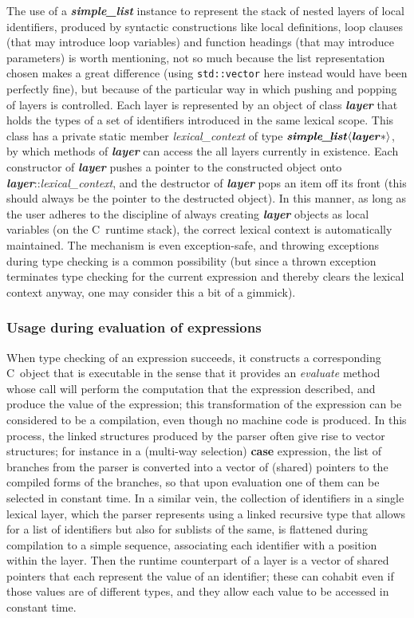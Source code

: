 \documentclass[12pt]{article}
\theoremstyle{plain}
\theoremstyle{definition}
\def\PP{\copy\PPbox}
\newcommand\Cee{\textsc{C}}
\newcommand\Cpp{\Cee\PP}
\newcommand\std[1]{\texttt{std::#1}}
\def\vect.{\std{vector}}
\def\smpl.{\textbf{\textit{simple\_\!list}}}
\def\lay.{\textbf{\textit{layer}}}
\def\ang#1{\langle#1\rangle}
\begin{document}
The use of a \smpl. instance to represent the stack of nested layers of local
identifiers, produced by syntactic constructions like local definitions, loop
clauses (that may introduce loop variables) and function headings (that may
introduce parameters) is worth mentioning, not so much because the list
representation chosen makes a great difference (using \vect. here instead would
have been perfectly fine), but because of the particular way in which pushing
and popping of layers is controlled. Each layer is represented by an object of
class \lay. that holds the types of a set of identifiers introduced in the same
lexical scope. This class has a private static member
\textit{lexical\_\!context} of type $\smpl.\ang{\lay.*}$, by which methods of
\lay. can access the all layers currently in existence. Each constructor of
\lay. pushes a pointer to the constructed object onto
\lay.::\textit{lexical\_\!context}, and the destructor of \lay. pops an item off
its front (this should always be the pointer to the destructed object). In this
manner, as long as the user adheres to the discipline of always creating \lay.
objects as local variables (on the \Cpp\ runtime stack), the correct lexical
context is automatically maintained. The mechanism is even exception-safe, and
throwing exceptions during type checking is a common possibility (but since a
thrown exception terminates type checking for the current expression and thereby
clears the lexical context anyway, one may consider this a bit of a gimmick).

\subsubsection{Usage during evaluation of expressions}

When type checking of an expression succeeds, it constructs a corresponding
\Cpp\ object that is executable in the sense that it provides an
\textit{evaluate} method whose call will perform the computation that the
expression described, and produce the value of the expression; this
transformation of the expression can be considered to be a compilation, even
though no machine code is produced. In this process, the linked structures
produced by the parser often give rise to vector structures; for instance in a
(multi-way selection) \textbf{case} expression, the list of branches from the
parser is converted into a vector of (shared) pointers to the compiled forms of
the branches, so that upon evaluation one of them can be selected in constant
time. In a similar vein, the collection of identifiers in a single lexical
layer, which the parser represents using a linked recursive type that allows for
a list of identifiers but also for sublists of the same, is flattened during
compilation to a simple sequence, associating each identifier with a position
within the layer. Then the runtime counterpart of a layer is a vector of shared
pointers that each represent the value of an identifier; these can cohabit even
if those values are of different types, and they allow each value to be accessed
in constant time.
\end{document}
